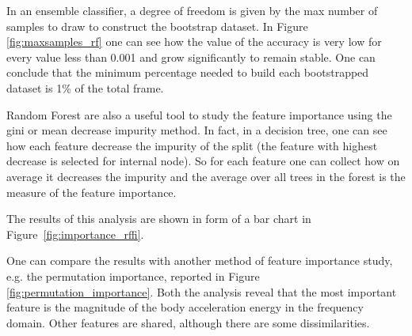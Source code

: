 \documentclass[10pt, a4paper, twocolumn]{article}
\begin{document}
In an ensemble classifier, a degree of freedom is given by the max number of samples to draw to construct the bootstrap dataset.
In Figure \ref{fig:maxsamples_rf} one can see how the value of the accuracy is very low for every value less than 0.001 and grow significantly to remain stable. One can conclude that the minimum percentage needed to build each bootstrapped dataset is 1\% of the total frame.

Random Forest are also a useful tool to study the feature importance using the gini or mean decrease impurity method. In fact, in a decision tree, one can see how each feature decrease the impurity of the split (the feature with highest decrease is selected for internal node). So for each feature one can collect how on average it decreases the impurity and the average over all trees in the forest is the measure of the feature importance. 

The results of this analysis are shown in form of a bar chart in Figure~\ref{fig:importance_rffi}. 

One can compare the results with another method of feature importance study, e.g. the permutation importance, reported in Figure \ref{fig:permutation_importance}. Both the analysis reveal that the most important feature is the magnitude of the body acceleration energy in the frequency domain. Other features are shared, although there are some dissimilarities.
\end{document}
